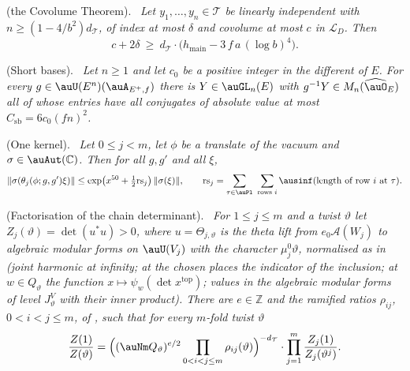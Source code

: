 \documentclass[10pt]{amsart}
\theoremstyle{definition}
\theoremstyle{remark}
\newcommand{\C}{\mathbb C}
\newcommand{\Z}{\mathbb Z}
\providecommand{\auLat}{\mathcal L}
\providecommand{\auT}{\mathcal T}
\providecommand{\audT}{d_{\auT}}
\providecommand{\auhmain}{h_{\mathrm{main}}}
\newenvironment{quotedthm}[2]{\par\medskip\noindent\begingroup
  \textbf{#1}#2.\ \itshape\ignorespaces}{\endgroup\par\medskip}
\begin{document}
\begin{quotedthm}{\cite[Theorem~14.15]{P46}}{ (the Covolume Theorem)}
Let $y_1,\dots,y_n\in\auT$ be linearly independent with $n\ge(1-4/b^2)\audT$, of index at most
$\delta$ and covolume at most $c$ in $\auLat_D$. Then
\[
c+2\delta\ \ge\ \audT\cdot\bigl(\auhmain-3\,f\,a\,(\log b)^4\bigr).
\]
\end{quotedthm}

\begin{quotedthm}{\cite[Lemma~14.21]{P46}}{ (Short bases)}
Let $n\ge1$ and let $c_0$ be a positive integer in the different of $E$. For every
$g\in\auU(E^n)(\auA_{E^+,f})$ there is $Y\in\auGL_n(E)$ with $g^{-1}Y\in M_n(\widehat{\auO}_E)$
all of whose entries have all conjugates of absolute value at most $C_{\mathrm{sb}}=6c_0(fn)^2$.
\end{quotedthm}

\begin{quotedthm}{\cite[Proposition~14.23]{P46}}{ (One kernel)}
Let $0\le j<m$, let $\phi$ be a translate of the vacuum and $\sigma\in\auAut(\C)$. Then for all
$g,g'$ and all $\xi$,
\[
\|\sigma(\theta_j(\phi;g,g')\xi)\|\le\exp\bigl(x^{50}+\tfrac12\mathrm{rs}_j\bigr)\,\|\sigma(\xi)\|,
\qquad\mathrm{rs}_j=\sum_{\tau\in\auPl}\ \sum_{\text{rows }i}\ausinf(\text{length of row }i
\text{ at }\tau).
\]
\end{quotedthm}

\begin{quotedthm}{\cite[Proposition~14.37]{P46}}{ (Factorisation of the chain determinant)}
For $1\le j\le m$ and a twist $\vartheta$ let $Z_j(\vartheta)=\det(u^*u)>0$, where
$u=\Theta_{j,\vartheta}$ is the theta lift from $e_0\mathcal A(W_j)$ to algebraic modular forms on
$\auU(V_j)$ with the character $\mu_j^0\vartheta$, normalised as in {\cite[\S2.4]{P53}} (joint
harmonic at infinity; at the chosen places the indicator of the inclusion; at $w\in Q_\vartheta$
the function $x\mapsto\psi_w(\det x^{\mathrm{top}})$; values in the algebraic modular forms of level
$J^V_\vartheta$ with their inner product). There are $e\in\Z$ and the ramified ratios $\rho_{ij}$,
$0<i<j\le m$, of {\cite[(9)]{P53}}, such that
for every $m$-fold twist $\vartheta$
\[
\frac{Z(1)}{Z(\vartheta)}=\Bigl((\auNm Q_\vartheta)^{e/2}\prod_{0<i<j\le m}\rho_{ij}(\vartheta)
\Bigr)^{-\audT}\cdot\prod_{j=1}^m\frac{Z_j(1)}{Z_j(\vartheta^j)} .
\]
\end{quotedthm}
\end{document}
